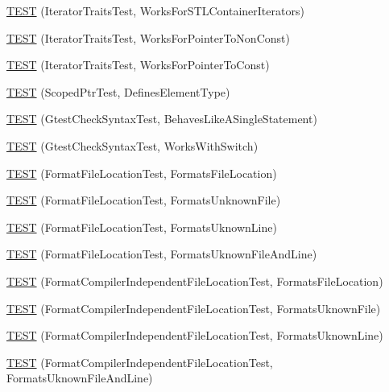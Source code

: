 \begin{DoxyCompactItemize}
\item 
\hyperlink{namespacetesting_1_1internal_abd56ca990c5b8c1aea44d15028a74f33}{T\+E\+ST} (Iterator\+Traits\+Test, Works\+For\+S\+T\+L\+Container\+Iterators)
\item 
\hyperlink{namespacetesting_1_1internal_a642234d85836450bb8795cf0a8a9f908}{T\+E\+ST} (Iterator\+Traits\+Test, Works\+For\+Pointer\+To\+Non\+Const)
\item 
\hyperlink{namespacetesting_1_1internal_afc0e95a0472d243967fd4720c681c478}{T\+E\+ST} (Iterator\+Traits\+Test, Works\+For\+Pointer\+To\+Const)
\item 
\hyperlink{namespacetesting_1_1internal_a99f56e2e9d5b30a879f877cc72bb0c0c}{T\+E\+ST} (Scoped\+Ptr\+Test, Defines\+Element\+Type)
\item 
\hyperlink{namespacetesting_1_1internal_a26d00130a017a66d0d60dc5a02a13d25}{T\+E\+ST} (Gtest\+Check\+Syntax\+Test, Behaves\+Like\+A\+Single\+Statement)
\item 
\hyperlink{namespacetesting_1_1internal_a4dfd147ff396984fca799878cb53dcea}{T\+E\+ST} (Gtest\+Check\+Syntax\+Test, Works\+With\+Switch)
\item 
\hyperlink{namespacetesting_1_1internal_a1a1c20d78e9e75b9c7f2b767eb62611b}{T\+E\+ST} (Format\+File\+Location\+Test, Formats\+File\+Location)
\item 
\hyperlink{namespacetesting_1_1internal_ace2f5407afdfb0767035d44b6758e4a0}{T\+E\+ST} (Format\+File\+Location\+Test, Formats\+Unknown\+File)
\item 
\hyperlink{namespacetesting_1_1internal_a17d1f472b6c1154de7b5b008b964ee32}{T\+E\+ST} (Format\+File\+Location\+Test, Formats\+Uknown\+Line)
\item 
\hyperlink{namespacetesting_1_1internal_a1195aaf7258c5442de7aebd95acefb9f}{T\+E\+ST} (Format\+File\+Location\+Test, Formats\+Uknown\+File\+And\+Line)
\item 
\hyperlink{namespacetesting_1_1internal_a9c12f8c1ebb19906e8fa0c430d139076}{T\+E\+ST} (Format\+Compiler\+Independent\+File\+Location\+Test, Formats\+File\+Location)
\item 
\hyperlink{namespacetesting_1_1internal_a65ad1cad17717c1b8ac4c2d4bef5e079}{T\+E\+ST} (Format\+Compiler\+Independent\+File\+Location\+Test, Formats\+Uknown\+File)
\item 
\hyperlink{namespacetesting_1_1internal_a0315a64a661f249628f2884080e0614f}{T\+E\+ST} (Format\+Compiler\+Independent\+File\+Location\+Test, Formats\+Uknown\+Line)
\item 
\hyperlink{namespacetesting_1_1internal_a8b9aee556f3dec6e67c35830ba55e0bd}{T\+E\+ST} (Format\+Compiler\+Independent\+File\+Location\+Test, Formats\+Uknown\+File\+And\+Line)

\end{DoxyCompactItemize}
